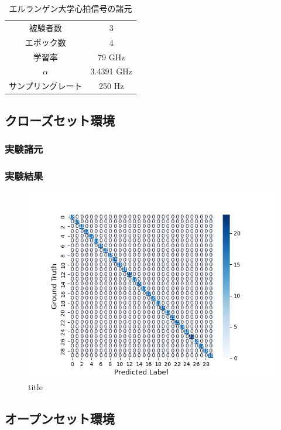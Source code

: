 \begin{table}[H]
\caption{エルランゲン大学心拍信号の諸元}
\centering
\begin{tabular}{cc}
\hline
被験者数 & 3 \\
エポック数 & 4 \\
学習率 & 79 GHz \\
$\alpha$ & 3.4391 GHz \\
サンプリングレート & 250 Hz \\
\hline
\end{tabular}
\label{table:30-dataset}
\end{table}

\subsection{クローズセット環境}
\subsubsection{実験諸元}
\subsubsection{実験結果}

\begin{figure}[H]
\begin{center}
\includegraphics[width=\linewidth]{./fig/clean_dataset/cross_val_Fold0_close.png}
\end{center}
\caption{title}
\end{figure}

\subsection{オープンセット環境}
